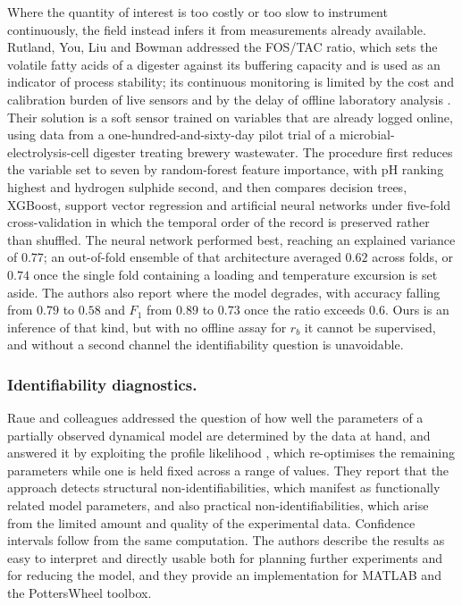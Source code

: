 \documentclass[runningheads]{llncs}
\newcommand{\rb}{\ensuremath{r_{b}}}
\begin{document}
Where the quantity of interest is too costly or too slow to instrument
continuously, the field instead infers it from measurements already
available. Rutland, You, Liu and Bowman addressed the FOS/TAC ratio,
which sets the volatile fatty acids of a digester against its
buffering capacity and is used as an indicator of process stability;
its continuous monitoring is limited by the cost and calibration
burden of live sensors and by the delay of offline laboratory
analysis \cite{rutland2025application}. Their solution is a soft sensor
trained on variables that are already logged online, using data from a
one-hundred-and-sixty-day pilot trial of a microbial-electrolysis-cell
digester treating brewery wastewater. The procedure first reduces the
variable set to seven by random-forest feature importance, with pH
ranking highest and hydrogen sulphide second, and then compares
decision trees, XGBoost, support vector regression and artificial
neural networks under five-fold cross-validation in which the temporal
order of the record is preserved rather than shuffled. The neural
network performed best, reaching an explained variance of $0.77$; an
out-of-fold ensemble of that architecture averaged $0.62$ across folds,
or $0.74$ once the single fold containing a loading and temperature
excursion is set aside. The authors also report where the model
degrades, with accuracy falling from $0.79$ to $0.58$ and $F_1$ from
$0.89$ to $0.73$ once the ratio exceeds $0.6$. Ours is an inference of
that kind, but with no offline assay for \rb{} it cannot be supervised,
and without a second channel the identifiability question is
unavoidable.

\subsubsection{Identifiability diagnostics.}
Raue and colleagues addressed the question of how well the parameters
of a partially observed dynamical model are determined by the data at
hand, and answered it by exploiting the profile
likelihood \cite{raue2009structural}, which re-optimises the remaining
parameters while one is held fixed across a range of values. They
report that the approach detects structural non-identifiabilities,
which manifest as functionally related model parameters, and also
practical non-identifiabilities, which arise from the limited amount
and quality of the experimental data. Confidence intervals follow from
the same computation. The authors describe the results as easy to
interpret and directly usable both for planning further experiments and
for reducing the model, and they provide an implementation for MATLAB
and the PottersWheel toolbox.
\end{document}
